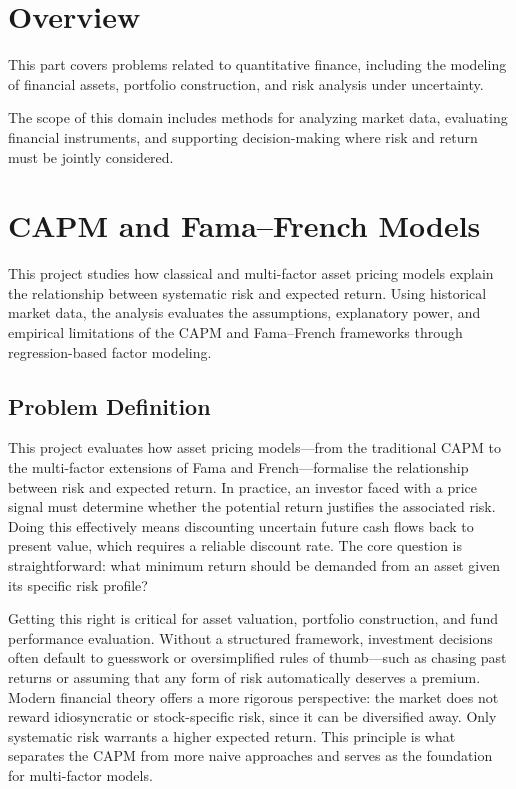 \documentclass[
  12pt,
  letterpaper,
]{book}
\begin{document}
\chapter*{Overview}\label{overview}


This part covers problems related to quantitative finance, including the
modeling of financial assets, portfolio construction, and risk analysis
under uncertainty.

The scope of this domain includes methods for analyzing market data,
evaluating financial instruments, and supporting decision-making where
risk and return must be jointly considered.

\chapter{CAPM and Fama--French Models}\label{capm-and-famafrench-models}

This project studies how classical and multi-factor asset pricing models
explain the relationship between systematic risk and expected return.
Using historical market data, the analysis evaluates the assumptions,
explanatory power, and empirical limitations of the CAPM and
Fama--French frameworks through regression-based factor modeling.

\section{Problem Definition}\label{problem-definition}

This project evaluates how asset pricing models---from the traditional
CAPM to the multi-factor extensions of Fama and French---formalise the
relationship between risk and expected return. In practice, an investor
faced with a price signal must determine whether the potential return
justifies the associated risk. Doing this effectively means discounting
uncertain future cash flows back to present value, which requires a
reliable discount rate. The core question is straightforward: what
minimum return should be demanded from an asset given its specific risk
profile?

Getting this right is critical for asset valuation, portfolio
construction, and fund performance evaluation. Without a structured
framework, investment decisions often default to guesswork or
oversimplified rules of thumb---such as chasing past returns or assuming
that any form of risk automatically deserves a premium. Modern financial
theory offers a more rigorous perspective: the market does not reward
idiosyncratic or stock-specific risk, since it can be diversified away.
Only systematic risk warrants a higher expected return. This principle
is what separates the CAPM from more naive approaches and serves as the
foundation for multi-factor models.
\end{document}
